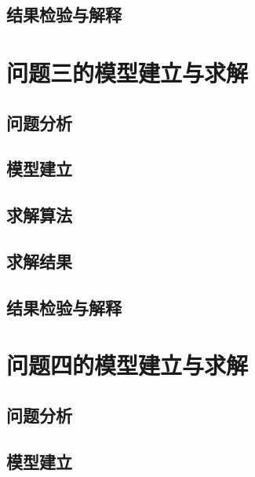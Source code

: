 \documentclass[withoutpreface,bwprint]{cumcmthesis}
\begin{document}
\subsection{结果检验与解释}
\vspace{0.10\textheight}

\clearpage
\section{问题三的模型建立与求解}

\subsection{问题分析}
\vspace{0.10\textheight}

\subsection{模型建立}
\vspace{0.14\textheight}

\subsection{求解算法}
\vspace{0.10\textheight}

\subsection{求解结果}
\vspace{0.12\textheight}

\subsection{结果检验与解释}
\vspace{0.10\textheight}

\clearpage
\section{问题四的模型建立与求解}

\subsection{问题分析}
\vspace{0.10\textheight}

\subsection{模型建立}
\vspace{0.14\textheight}
\end{document}
